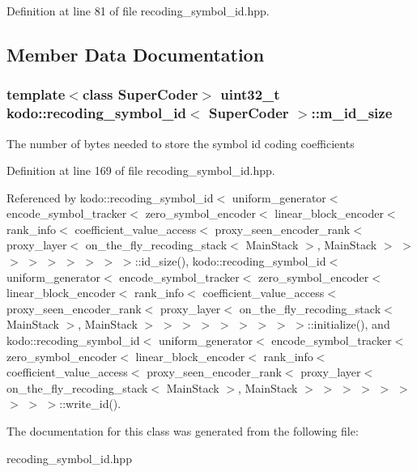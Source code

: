 Definition at line 81 of file recoding\-\_\-symbol\-\_\-id.\-hpp.



\subsection{Member Data Documentation}
\hypertarget{classkodo_1_1recoding__symbol__id_a8cd892afcd6cb06da3ed1b892e78f342}{
\subsubsection[{m\-\_\-id\-\_\-size}]{\setlength{\rightskip}{0pt plus 5cm}template$<$class Super\-Coder$>$ uint32\-\_\-t {\bf kodo\-::recoding\-\_\-symbol\-\_\-id}$<$ Super\-Coder $>$\-::m\-\_\-id\-\_\-size\hspace{0.3cm}{\ttfamily [protected]}}}\label{classkodo_1_1recoding__symbol__id_a8cd892afcd6cb06da3ed1b892e78f342}
The number of bytes needed to store the symbol id coding coefficients 

Definition at line 169 of file recoding\-\_\-symbol\-\_\-id.\-hpp.



Referenced by kodo\-::recoding\-\_\-symbol\-\_\-id$<$ uniform\-\_\-generator$<$ encode\-\_\-symbol\-\_\-tracker$<$ zero\-\_\-symbol\-\_\-encoder$<$ linear\-\_\-block\-\_\-encoder$<$ rank\-\_\-info$<$ coefficient\-\_\-value\-\_\-access$<$ proxy\-\_\-seen\-\_\-encoder\-\_\-rank$<$ proxy\-\_\-layer$<$ on\-\_\-the\-\_\-fly\-\_\-recoding\-\_\-stack$<$ Main\-Stack $>$, Main\-Stack $>$ $>$ $>$ $>$ $>$ $>$ $>$ $>$ $>$\-::id\-\_\-size(), kodo\-::recoding\-\_\-symbol\-\_\-id$<$ uniform\-\_\-generator$<$ encode\-\_\-symbol\-\_\-tracker$<$ zero\-\_\-symbol\-\_\-encoder$<$ linear\-\_\-block\-\_\-encoder$<$ rank\-\_\-info$<$ coefficient\-\_\-value\-\_\-access$<$ proxy\-\_\-seen\-\_\-encoder\-\_\-rank$<$ proxy\-\_\-layer$<$ on\-\_\-the\-\_\-fly\-\_\-recoding\-\_\-stack$<$ Main\-Stack $>$, Main\-Stack $>$ $>$ $>$ $>$ $>$ $>$ $>$ $>$ $>$\-::initialize(), and kodo\-::recoding\-\_\-symbol\-\_\-id$<$ uniform\-\_\-generator$<$ encode\-\_\-symbol\-\_\-tracker$<$ zero\-\_\-symbol\-\_\-encoder$<$ linear\-\_\-block\-\_\-encoder$<$ rank\-\_\-info$<$ coefficient\-\_\-value\-\_\-access$<$ proxy\-\_\-seen\-\_\-encoder\-\_\-rank$<$ proxy\-\_\-layer$<$ on\-\_\-the\-\_\-fly\-\_\-recoding\-\_\-stack$<$ Main\-Stack $>$, Main\-Stack $>$ $>$ $>$ $>$ $>$ $>$ $>$ $>$ $>$\-::write\-\_\-id().



The documentation for this class was generated from the following file\-:\begin{DoxyCompactItemize}
\item 
recoding\-\_\-symbol\-\_\-id.\-hpp\end{DoxyCompactItemize}
